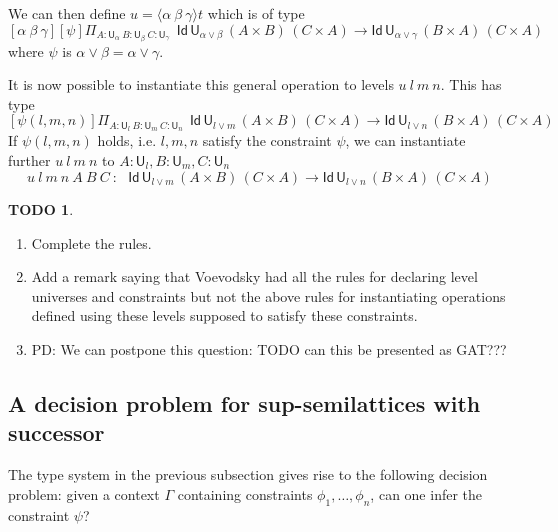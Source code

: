 \documentclass[11pt,a4paper]{article}
\theoremstyle{definition}
\newtheorem{TODO}{TODO}[theorem]
\newcommand{\Id}{\mathsf{Id}}
\newcommand{\lam}[2]{{\langle}#1{\rangle}#2}
\def\UU{\mathsf{U}}
\begin{document}
    We can then define $u = \lam{\alpha~\beta~\gamma}t$ which is of type
    $$[\alpha~\beta~\gamma][\psi]\Pi_{A:\UU_\alpha~{B}:{\UU_\beta}~{C}:{\UU_\gamma}}
    {~~\Id\,\UU_{\alpha \vee \beta}\, (A\times B)\,(C \times A)
    \to \Id\,\UU_{\alpha \vee \gamma}\, (B\times A)\,(C \times A)}
$$
    where $\psi$ is $\alpha \vee \beta = \alpha \vee \gamma$.

    It is now possible to instantiate this general operation to levels $u~l~m~n$. This has type
    $$[\psi(l,m,n)]\Pi_{A:\UU_l~{B}:{\UU_m}~{C}:{\UU_n}}
    {~~\Id\,\UU_{l \vee m}\, (A\times B)\,(C \times A)
    \to \Id\,\UU_{l \vee n}\, (B\times A)\,(C \times A)}
$$
    If $\psi(l,m,n)$ holds, i.e. $l,m,n$ satisfy the constraint $\psi$, we can instantiate
    further $u~l~m~n$ to $A:\UU_l,B:\UU_m,C:\UU_n$
    $$u~l~m~n~A~B~C~:~    {~~\Id\,\UU_{l \vee m}\, (A\times B)\,(C \times A)
    \to \Id\,\UU_{l \vee n}\, (B\times A)\,(C \times A)}$$



\begin{TODO}
  \begin{enumerate}
  \item Complete the rules.
  \item Add a remark saying that Voevodsky had all the rules for declaring level universes and
    constraints but not the above rules for instantiating operations defined using these levels
    supposed to satisfy these constraints.
  \item PD: We can postpone this question: TODO   can this be presented as GAT???
   \end{enumerate}
 \end{TODO}

\subsection{A decision problem for sup-semilattices with successor}

The type system in the previous subsection gives rise to the following
decision problem: given a context $\Gamma$ containing constraints $\phi_1,\ldots,\phi_n$,
can one infer the constraint $\psi$?
\end{document}
